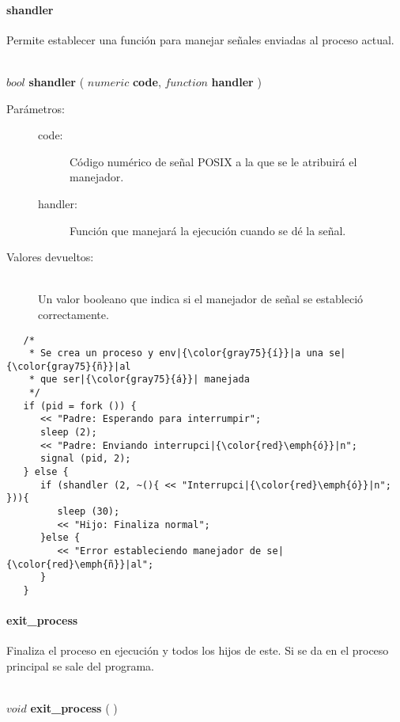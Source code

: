 \paragraph{shandler}
Permite establecer una función para manejar señales enviadas al proceso actual. 

\begin{framed}
\hfill \\ $bool$ \textbf{shandler} ( $numeric$ \textbf{code}, $function$ \textbf{handler} )  
\begin{description}
\item [Parámetros:] \hfill 
   \begin{description}
   \item[code:] Código numérico de señal POSIX a la que se le atribuirá el manejador.
   \item[handler:] Función que manejará la ejecución cuando se dé la señal.
   \end{description}
\item[Valores devueltos:] \hfill \\
   Un valor booleano que indica si el manejador de señal se estableció correctamente. 
\end{description}
\end{framed}
     
\begin{lstlisting}  
   /*
    * Se crea un proceso y env|{\color{gray75}{í}}|a una se|{\color{gray75}{ñ}}|al 
    * que ser|{\color{gray75}{á}}| manejada
    */
   if (pid = fork ()) {
      << "Padre: Esperando para interrumpir";
      sleep (2);
      << "Padre: Enviando interrupci|{\color{red}\emph{ó}}|n";
      signal (pid, 2);
   } else {
      if (shandler (2, ~(){ << "Interrupci|{\color{red}\emph{ó}}|n"; })){
         sleep (30);
         << "Hijo: Finaliza normal";
      }else {
         << "Error estableciendo manejador de se|{\color{red}\emph{ñ}}|al";
      }
   }
\end{lstlisting}

\paragraph{exit\_process}
Finaliza el proceso en ejecución y todos los hijos de este. Si se da en el
proceso principal se sale del programa.

\begin{framed}
\hfill \\ $void$ \textbf{exit\_process} ( )  
\end{framed}
     
